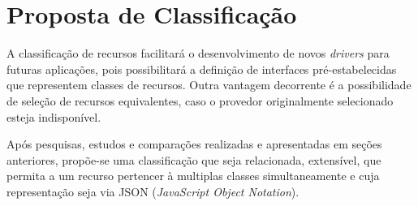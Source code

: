 \chapter{Proposta de Classificação}
A classificação de recursos facilitará o desenvolvimento de novos \emph{drivers} para futuras aplicações, pois possibilitará a definição de interfaces pré-estabelecidas que representem classes de recursos. Outra vantagem decorrente é a possibilidade de seleção de recursos equivalentes, caso o provedor originalmente selecionado esteja indisponível.

Após pesquisas, estudos e comparações realizadas e apresentadas em seções anteriores, propõe-se uma classificação que seja relacionada, extensível, que permita a um recurso pertencer à multiplas classes simultaneamente e cuja representação seja via JSON (\emph{JavaScript Object Notation}).


